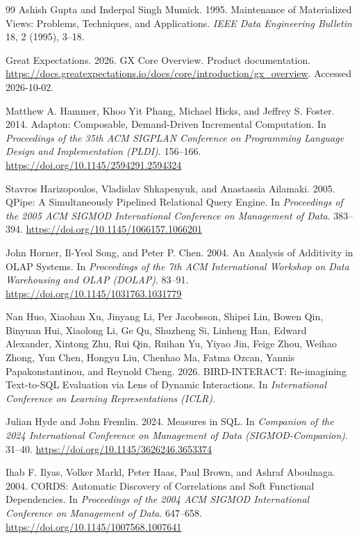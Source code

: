 \begin{thebibliography}{99}
Ashish Gupta and Inderpal Singh Mumick. 1995. Maintenance of Materialized Views: Problems, Techniques, and Applications. \emph{IEEE Data Engineering Bulletin} 18, 2 (1995), 3--18.

Great Expectations. 2026. GX Core Overview. Product documentation. \url{https://docs.greatexpectations.io/docs/core/introduction/gx_overview}. Accessed 2026-10-02.

Matthew A. Hammer, Khoo Yit Phang, Michael Hicks, and Jeffrey S. Foster. 2014. Adapton: Composable, Demand-Driven Incremental Computation. In \emph{Proceedings of the 35th ACM SIGPLAN Conference on Programming Language Design and Implementation (PLDI)}. 156--166. \url{https://doi.org/10.1145/2594291.2594324}

Stavros Harizopoulos, Vladislav Shkapenyuk, and Anastassia Ailamaki. 2005. QPipe: A Simultaneously Pipelined Relational Query Engine. In \emph{Proceedings of the 2005 ACM SIGMOD International Conference on Management of Data}. 383--394. \url{https://doi.org/10.1145/1066157.1066201}

John Horner, Il-Yeol Song, and Peter P. Chen. 2004. An Analysis of Additivity in OLAP Systems. In \emph{Proceedings of the 7th ACM International Workshop on Data Warehousing and OLAP (DOLAP)}. 83--91. \url{https://doi.org/10.1145/1031763.1031779}

Nan Huo, Xiaohan Xu, Jinyang Li, Per Jacobsson, Shipei Lin, Bowen Qin, Binyuan Hui, Xiaolong Li, Ge Qu, Shuzheng Si, Linheng Han, Edward Alexander, Xintong Zhu, Rui Qin, Ruihan Yu, Yiyao Jin, Feige Zhou, Weihao Zhong, Yun Chen, Hongyu Liu, Chenhao Ma, Fatma Ozcan, Yannis Papakonstantinou, and Reynold Cheng. 2026. BIRD-INTERACT: Re-imagining Text-to-SQL Evaluation via Lens of Dynamic Interactions. In \emph{International Conference on Learning Representations (ICLR)}.

Julian Hyde and John Fremlin. 2024. Measures in SQL. In \emph{Companion of the 2024 International Conference on Management of Data (SIGMOD-Companion)}. 31--40. \url{https://doi.org/10.1145/3626246.3653374}

Ihab F. Ilyas, Volker Markl, Peter Haas, Paul Brown, and Ashraf Aboulnaga. 2004. CORDS: Automatic Discovery of Correlations and Soft Functional Dependencies. In \emph{Proceedings of the 2004 ACM SIGMOD International Conference on Management of Data}. 647--658. \url{https://doi.org/10.1145/1007568.1007641}


\end{thebibliography}
